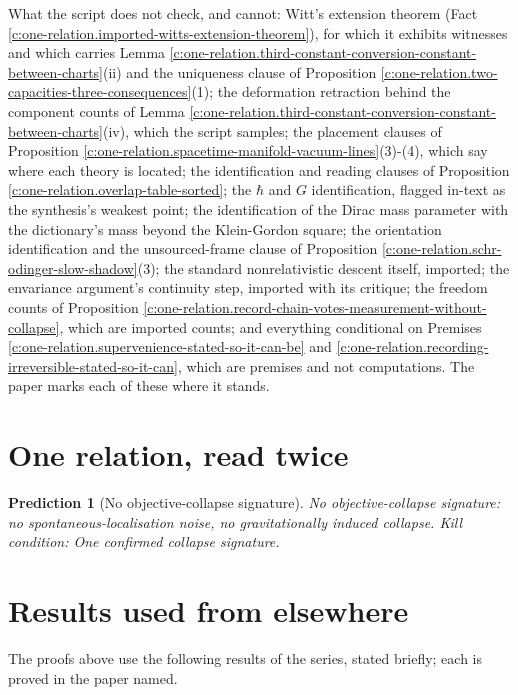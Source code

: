 \documentclass[11pt]{article}
\newtheorem{prediction}[theorem]{Prediction}
\theoremstyle{definition}
\theoremstyle{plain}
\begin{document}
What the script does not check, and cannot: Witt's extension theorem (Fact \ref{c:one-relation.imported-witts-extension-theorem}), for which it exhibits witnesses and which carries Lemma \ref{c:one-relation.third-constant-conversion-constant-between-charts}(ii) and the uniqueness clause of Proposition \ref{c:one-relation.two-capacities-three-consequences}(1); the deformation retraction behind the component counts of Lemma \ref{c:one-relation.third-constant-conversion-constant-between-charts}(iv), which the script samples; the placement clauses of Proposition \ref{c:one-relation.spacetime-manifold-vacuum-lines}(3)-(4), which say where each theory is located; the identification and reading clauses of Proposition \ref{c:one-relation.overlap-table-sorted}; the $\hbar$ and $G$ identification, flagged in-text as the synthesis's weakest point; the identification of the Dirac mass parameter with the dictionary's mass beyond the Klein-Gordon square; the orientation identification and the unsourced-frame clause of Proposition \ref{c:one-relation.schr-odinger-slow-shadow}(3); the standard nonrelativistic descent itself, imported; the envariance argument's continuity step, imported with its critique; the freedom counts of Proposition \ref{c:one-relation.record-chain-votes-measurement-without-collapse}, which are imported counts; and everything conditional on Premises \ref{c:one-relation.supervenience-stated-so-it-can-be} and \ref{c:one-relation.recording-irreversible-stated-so-it-can}, which are premises and not computations. The paper marks each of these where it stands.

\section{One relation, read twice}

\begin{prediction}[No objective-collapse signature]\label{c:pred.no-objective-collapse}
No objective-collapse signature: no spontaneous-localisation noise, no gravitationally induced collapse.
\emph{Kill condition:} One confirmed collapse signature.
\end{prediction}

\section{Results used from elsewhere}
The proofs above use the following results of the series, stated briefly; each is proved in the paper named.
\end{document}
